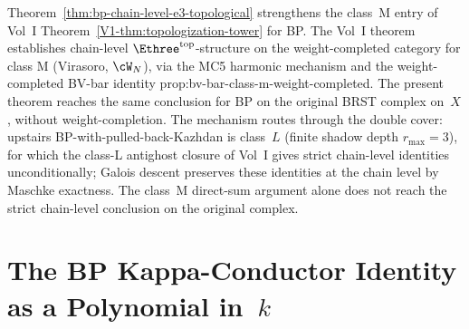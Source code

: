 \begin{remark}
\label{rem:bp-chain-vs-weight-completed-sharp}
Theorem~\ref{thm:bp-chain-level-e3-topological} strengthens the
class~M entry of Vol~I Theorem~\ref{V1-thm:topologization-tower} for
BP. The Vol~I theorem establishes chain-level
$\Ethree^{\mathrm{top}}$-structure on the weight-completed category
for class M (Virasoro, $\cW_N$), via the MC5 harmonic mechanism and
the weight-completed BV-bar identity
prop:bv-bar-class-m-weight-completed. The present theorem reaches the
same conclusion for BP on the original BRST complex on~$X$, without
weight-completion. The mechanism routes through the double cover:
upstairs BP-with-pulled-back-Kazhdan is class~$L$ (finite shadow
depth $r_{\max} = 3$), for which the class-L antighost closure of
Vol~I gives strict chain-level identities unconditionally; Galois
descent preserves these identities at the chain level by Maschke
exactness. The class~M direct-sum argument alone does not reach the
strict chain-level conclusion on the original complex.
\end{remark}

\section{The BP Kappa-Conductor Identity as a Polynomial in~$k$}
\label{sec:bp-kappa-conductor}

